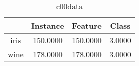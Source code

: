 \begin{table}
\centering
\begin{tabular}{cccc}
\toprule
 & Instance & Feature & Class \\
\midrule
iris & 150.0000 & 150.0000 & 3.0000 \\
wine & 178.0000 & 178.0000 & 3.0000 \\
\bottomrule
\end{tabular}
\caption{c00data}
\label{table:c00data}
\end{table}
